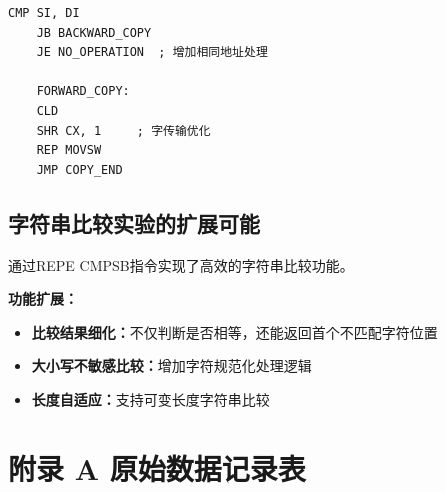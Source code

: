 \documentclass[UTF8]{article}
\begin{document}
\begin{lstlisting}[language={[x86masm]Assembler}]
	CMP SI, DI
	JB BACKWARD_COPY
	JE NO_OPERATION  ; 增加相同地址处理
	
	FORWARD_COPY:
	CLD
	SHR CX, 1     ; 字传输优化
	REP MOVSW
	JMP COPY_END
\end{lstlisting}

\subsection{字符串比较实验的扩展可能}

通过REPE CMPSB指令实现了高效的字符串比较功能。

\textbf{功能扩展：}

\begin{itemize}
	\item \textbf{比较结果细化：}不仅判断是否相等，还能返回首个不匹配字符位置
	\item \textbf{大小写不敏感比较：}增加字符规范化处理逻辑
	\item \textbf{长度自适应：}支持可变长度字符串比较
\end{itemize}























































\newpage
\section*{附录 A\hspace*{20pt} 原始数据记录表}
\thispagestyle{fancy} 
\begin{figure}[H]\centering
\end{figure}
\end{document}
